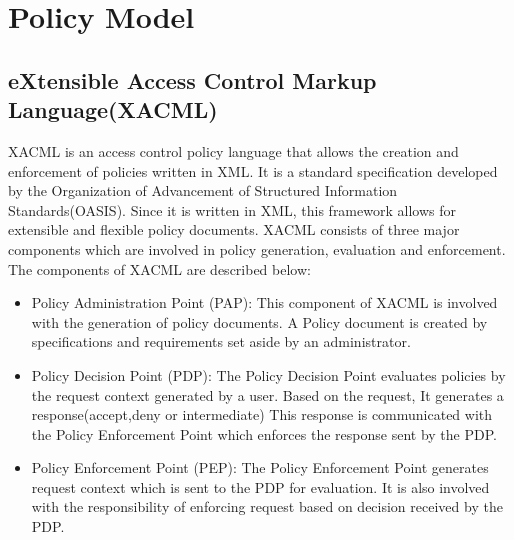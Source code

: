 \section{Policy Model}

\subsection{eXtensible Access Control Markup Language(XACML)}
 XACML is an access control policy language that allows the creation and enforcement of policies written in XML. It is a standard specification developed by the Organization of Advancement of Structured Information Standards(OASIS). Since it is written in XML, this framework allows for extensible and flexible policy documents. XACML consists of three major components which are involved in policy generation, evaluation and enforcement. The components of XACML are described below: 
 
 
 \begin{itemize}
 
 \item Policy Administration Point (PAP): This component of XACML
is involved with the generation of policy documents. A Policy document is created by specifications and requirements set aside by an administrator.

 \item Policy Decision Point (PDP): The Policy Decision Point evaluates policies by the request context generated by a user. Based on the request, It generates a response(accept,deny or intermediate) This response is communicated with the Policy Enforcement Point which enforces the response sent by the PDP.


\item Policy Enforcement Point (PEP):  The Policy Enforcement Point generates request context which is sent to the PDP for evaluation. It is also involved with the responsibility of enforcing request based on decision received by the PDP.

 \end{itemize}
 
 
 
